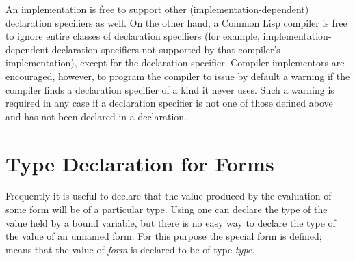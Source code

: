 An implementation is free to support other (implementation-dependent)
declaration specifiers as well.
On the other hand, a Common Lisp compiler is free to
ignore entire classes of declaration specifiers (for example,
implementation-dependent declaration specifiers
not supported by that compiler's
implementation), except for the  declaration specifier.
Compiler implementors are encouraged, however, to
program the compiler to issue by default a warning if the compiler finds
a declaration specifier of a kind it never uses.  Such a warning is required
in any case
if a declaration specifier is not one of those defined above and has not been
declared in a  declaration.

\section{Type Declaration for Forms}

Frequently it is useful to declare that the value produced
by the evaluation of some form will be of a particular type.
Using  one can declare the type of the value
held by a bound variable, but there is no easy way to declare
the type of the value of an unnamed form.  For this purpose the 
special form is defined;  means
that the value of \emph{form} is declared to be of type \emph{type}.

